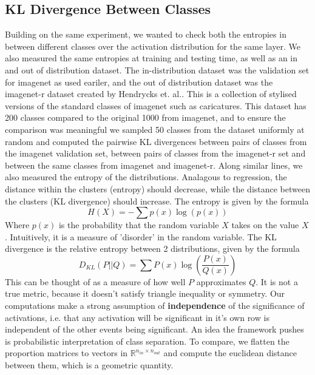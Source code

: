 \documentclass{article}
\begin{document}
        \subsection{KL Divergence Between Classes}
            Building on the same experiment, we wanted to check both the entropies in between different classes over the activation distribution for the same layer. We also measured the same entropies at training and testing time, as well as an in and out of distribution dataset. The in-distribution dataset was the validation set for imagenet as used eariler, and the out of distribution dataset was the imagenet-r dataset created by Hendrycks et. al.\cite{hendrycks2021facesrobustnesscriticalanalysis}. This is a collection of stylised versions of the standard classes of imagenet such as caricatures. This dataset has 200 classes compared to the original 1000 from imagenet, and to ensure the comparison was meaningful we sampled 50 classes from the dataset uniformly at random and computed the pairwise KL divergences between pairs of classes from the imagenet validation set, between pairs of classes from the imagenet-r set and between the same classes from imagenet and imagenet-r. Along similar lines, we also measured the entropy of the distributions. Analagous to regression, the distance within the clusters (entropy) should decrease, while the distance between the clusters (KL divergence) should increase. The entropy is given by the formula
            \[H(X) = -\sum p(x)\log(p(x))\]
            Where $p(x)$ is the probability that the random variable $X$ takes on the value $X$. Intuitively, it is a measure of 'disorder' in the random variable. The KL divergence is the relative entropy between 2 distributions, given by the formula 
            \[D_{KL}(P||Q) = \sum P(x)\log(\frac{P(x)}{Q(x)})\]
            This can be thought of as a measure of how well $P$ approximates $Q$. It is not a true metric, because it doesn't satisfy triangle inequality or symmetry. Our computations make a strong assumption of \textbf{independence} of the significance of activations, i.e. that any activation will be significant in it's own row is independent of the other events being significant. 
            An idea the framework pushes is probabilistic interpretation of class separation. To compare, we flatten the proportion matrices to vectors in $\mathbb{R}^{n_{in}\times n_{out}}$ and compute the euclidean distance between them, which is a geometric quantity. 
        
\end{document}
